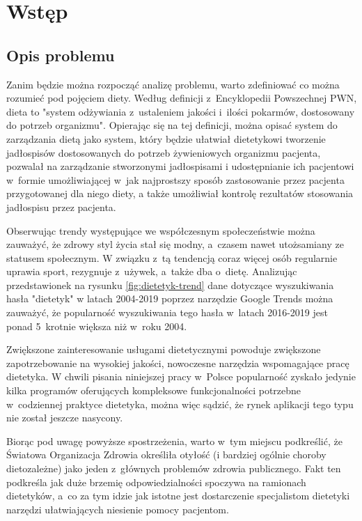 \chapter*{Wstęp}\label{ch:admission}

\section*{Opis problemu}\label{sec:problem-description}

Zanim będzie można rozpocząć analizę problemu, warto zdefiniować co można rozumieć pod pojęciem diety.
Według definicji z~Encyklopedii Powszechnej PWN, dieta to "system odżywiania z~ustaleniem jakości i~ilości pokarmów,
dostosowany do potrzeb organizmu"\cite{book:encyklopedia-dieta}.
Opierając się na tej definicji, można opisać system do zarządzania dietą jako system,
który będzie ułatwiał dietetykowi tworzenie jadłospisów dostosowanych do potrzeb żywieniowych organizmu pacjenta, pozwalał na zarządzanie stworzonymi jadłospisami
i udostępnianie ich pacjentowi w~formie umożliwiającej w~jak najprostszy sposób zastosowanie przez pacjenta przygotowanej dla niego diety,
a także umożliwiał kontrolę rezultatów stosowania jadłospisu przez pacjenta.

\par
Obserwując trendy występujące we współczesnym społeczeństwie można zauważyć, że zdrowy styl życia stał się modny, a~czasem nawet utożsamiany ze statusem społecznym.
W związku z~tą tendencją coraz więcej osób regularnie uprawia sport, rezygnuje z~używek, a~także dba o~dietę.
Analizując przedstawionek na rysunku \ref{fig:dietetyk-trend} dane dotyczące wyszukiwania hasła "dietetyk" w latach 2004-2019 poprzez narzędzie Google Trends\cite{url:google-trends} można zauważyć,
że popularność wyszukiwania tego hasła w~latach 2016-2019 jest ponad 5~krotnie większa niż w~roku 2004.

Zwiększone zainteresowanie usługami dietetycznymi powoduje zwiększone zapotrzebowanie na wysokiej jakości, nowoczesne narzędzia wspomagające pracę dietetyka.
W chwili pisania niniejszej pracy w~Polsce popularność zyskało jedynie kilka programów oferujących kompleksowe funkcjonalności potrzebne w~codziennej praktyce dietetyka,
można więc sądzić, że rynek aplikacji tego typu nie został jeszcze nasycony.

\par
Biorąc pod uwagę powyższe spostrzeżenia, warto w~tym miejscu podkreślić, że Światowa Organizacja Zdrowia określiła otyłość
(i bardziej ogólnie choroby dietozależne) jako jeden z~głównych problemów zdrowia publicznego\cite{article:dietetyk-na-rynku-uslug-medycznych}.
Fakt ten podkreśla jak duże brzemię odpowiedzialności spoczywa na ramionach dietetyków,
a~co za tym idzie jak istotne jest dostarczenie specjalistom dietetyki narzędzi ułatwiających niesienie pomocy pacjentom.

